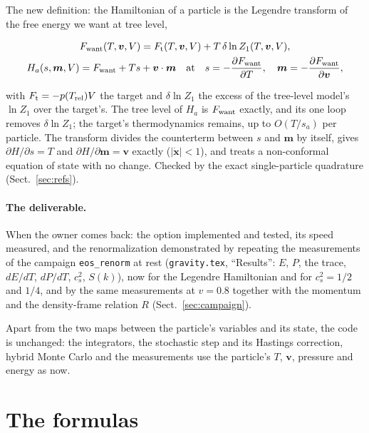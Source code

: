 \documentclass[11pt,aps,preprint,nofootinbib,superscriptaddress,tightenlines]{revtex4-2}
\def\st{\begin{equation}}
\def\stp{\end{equation}}
\def\Sect#1{Sect.~\ref{#1}}
\let\oldparagraph\paragraph
\renewcommand{\paragraph}{\par\bigskip\oldparagraph}
\begin{document}
The new definition: the Hamiltonian of a particle is the Legendre transform of the free energy we want at tree level,
\begin{keyeq}
\st
\begin{gathered}
F_{\rm want}(T,\bm v,V)=F_{\rm t}(T,\bm v,V)+T\,\delta\ln Z_1(T,\bm v,V),\\
H_a(s,\bm m,V)=F_{\rm want}+Ts+\bm v\cdot\bm m\quad\text{at}\quad s=-\frac{\partial F_{\rm want}}{\partial T},\quad \bm m=-\frac{\partial F_{\rm want}}{\partial\bm v},
\end{gathered}
\label{Hdef}
\stp
\end{keyeq}
with $F_{\rm t}=-p(T_{\rm rel})V$ the target and $\delta\ln Z_1$ the excess of the tree-level model's $\ln Z_1$ over the target's.  The tree level of $H_a$ is
$F_{\rm want}$ exactly, and its one loop removes $\delta\ln Z_1$; the target's thermodynamics remains, up to $O(T/s_a)$ per particle.  The transform divides
the counterterm between $s$ and $\bm m$ by itself, gives $\partial H/\partial s=T$ and $\partial H/\partial\bm m=\bm v$ exactly ($|\dot{\bm x}|<1$), and treats a
non-conformal equation of state with no change.  Checked by the exact single-particle quadrature (\Sect{sec:refs}).

\paragraph{The deliverable.}  When the owner comes back: the option implemented and tested, its speed measured, and the renormalization demonstrated by
repeating the measurements of the campaign \texttt{eos\_renorm} at rest (\nolinkurl{gravity.tex}, ``Results'': $E$, $P$, the trace, $dE/dT$, $dP/dT$, $c_s^2$,
$S(k)$), now for the Legendre Hamiltonian and for $c_s^2=1/2$ and $1/4$, and by the same measurements at $v=0.8$ together with the momentum and the
density-frame relation $R$ (\Sect{sec:campaign}).

Apart from the two maps between the particle's variables and its state, the code is unchanged: the integrators, the stochastic step and its
Hastings correction, hybrid Monte Carlo and the measurements use the particle's $T$, $\bm v$, pressure and energy as now.

\section{The formulas}
\label{sec:formulas}
\end{document}
